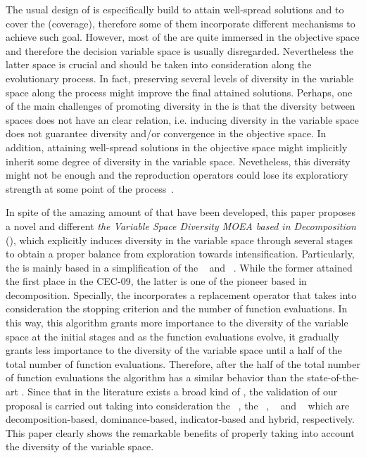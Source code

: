 The usual design of \MOEAS{} is especifically build to attain well-spread solutions and to cover the \PF{} (coverage), therefore some of them incorporate different mechanisms to achieve such goal.
%
However, most of the \MOEAS{} are quite immersed in the objective space and therefore the decision variable space is usually disregarded.
%
Nevertheless the latter space is crucial and should be taken into consideration along the evolutionary process.
%
In fact, preserving several levels of diversity in the variable space along the process might improve the final attained solutions.
%
Perhaps, one of the main challenges of promoting diversity in the \MOPS{} is that the diversity between spaces does not have an clear relation, i.e. inducing diversity in the variable space does not guarantee diversity and/or convergence in the objective space.
%
In addition, attaining well-spread solutions in the objective space might implicitly inherit some degree of diversity in the variable space.
%
Nevetheless, this diversity might not be enough and the reproduction operators could lose its exploratiory strength at some point of the process~\cite{lu2002dynamic}.
%

In spite of the amazing amount of \MOEAS{} that have been developed, this paper proposes a novel and different \MOEA{} \textit{the Variable Space Diversity MOEA based in Decomposition} (\VSDMOEAD{}), which explicitly induces diversity in the variable space through several stages to obtain a proper balance from exploration towards intensification.
%
Particularly, the \VSDMOEAD{} is mainly based in a simplification of the \MOEADDE{}~\cite{zhang2009performance} and \CMOGA{}~\cite{murata2002cellular}.
%
While the former attained the first place in the CEC-09, the latter is one of the pioneer \MOEAS{} based in decomposition.
%
Specially, the \VSDMOEAD{} incorporates a replacement operator that takes into consideration the stopping criterion and the number of function evaluations.
%
In this way, this algorithm grants more importance to the diversity of the variable space at the initial stages and as the function evaluations evolve, it gradually grants less importance to the diversity of the variable space until a half of the total number of function evaluations.
%
Therefore, after the half of the total number of function evaluations the algorithm has a similar behavior than the state-of-the-art \MOEAS{}.
%
Since that in the literature exists a broad kind of \MOEAS{}, the validation of our proposal is carried out taking into consideration the \MOEADDE{}~\cite{zhang2009performance}, the \NSGAII{}~\cite{deb2002fast}, \REMOA{}~\cite{trautmann2013r2} and \NSGAIII{}~\cite{deb2013evolutionary} which are decomposition-based, dominance-based, indicator-based and hybrid, respectively.
%
This paper clearly shows the remarkable benefits of properly taking into account the diversity of the variable space.

